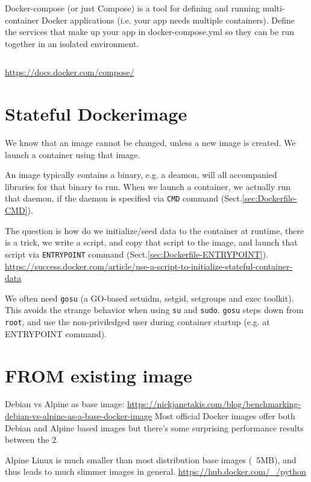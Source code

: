 Docker-compose (or just Compose) is a tool for defining and running
multi-container Docker applications (i.e. your app needs multiple containers).
Define the services that make up your app in docker-compose.yml so they can be
run together in an isolated environment.
\begin{verbatim}

\end{verbatim}
\url{https://docs.docker.com/compose/}

\section{Stateful Dockerimage}

We know that an image cannot be changed, unless a new image is created.
We launch a container using that image.

An image typically contains a binary, e.g. a deamon, will all accompanied
libraries for that binary to run.
When we launch a container, we actually run that daemon, if the daemon is
specified via \verb!CMD! command (Sect.\ref{sec:Dockerfile-CMD}).

The question is how do we initialize/seed data to the container at runtime, 
there is a trick, we write a script, and copy that script to the image, and launch that script via 
\verb!ENTRYPOINT! command (Sect.\ref{sec:Dockerfile-ENTRYPOINT}). 
\url{https://success.docker.com/article/use-a-script-to-initialize-stateful-container-data}

We often need \verb!gosu! (a GO-based setuidm, setgid, setgroups and exec
toolkit). This avoids the strange behavior when using \verb!su! and \verb!sudo!.
\verb!gosu! steps down from \verb!root!, and use the non-priviledged user during
container startup (e.g. at ENTRYPOINT command).

\section{FROM existing image}

Debian vs Alpine as base image:
\url{https://nickjanetakis.com/blog/benchmarking-debian-vs-alpine-as-a-base-docker-image}
Most official Docker images offer both Debian and Alpine based images but
there's some surprising performance results between the 2.

Alpine Linux is much smaller than most distribution base images (~5MB), and thus
leads to much slimmer images in general.
\url{https://hub.docker.com/_/python}




